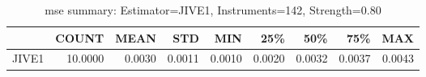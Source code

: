 \begin{table}[ht]
\centering
\caption{mse summary: Estimator=JIVE1, Instruments=142, Strength=0.80}
\begin{tabular}{lrrrrrrrr}
\toprule
 & COUNT & MEAN & STD & MIN & 25\% & 50\% & 75\% & MAX \\
\midrule
JIVE1 & 10.0000 & 0.0030 & 0.0011 & 0.0010 & 0.0020 & 0.0032 & 0.0037 & 0.0043 \\
\bottomrule
\end{tabular}
\end{table}
